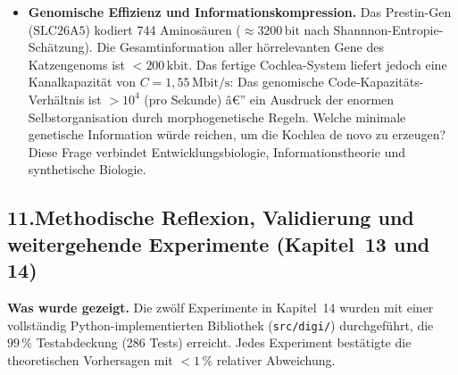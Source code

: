 ﻿\documentclass[12pt,a4paper,titlepage]{report}
\begin{document}
\begin{itemize}[leftmargin=2em]
    genau den Gammatone-Filtern der Basilarmembran entsprechen.
    Eine numerische STDP-Simulation, die aus $1/f$-Rauschen
    beginnt und auf Gammatone-Filter konvergiert, würde diese
    evolutionäre Self-Organisationsthese numerisch beweisen.
  \item \textbf{Genomische Effizienz und Informationskompression.}
    Das Prestin-Gen ($\mathrm{SLC26A5}$) kodiert 744 Aminosäuren
    ($\approx 3200\,\mathrm{bit}$ nach Shannnon-Entropie-Schätzung).
    Die Gesamtinformation aller hörrelevanten Gene des Katzengenoms
    ist $< 200\,\mathrm{kbit}$.
    Das fertige Cochlea-System liefert jedoch eine Kanalkapazität
    von $C = 1{,}55\,\mathrm{Mbit/s}$:
    Das genomische Code-Kapazitäts-Verhältnis ist
    $> 10^4$ (pro Sekunde) â€” ein Ausdruck der enormen
    Selbstorganisation durch morphogenetische Regeln.
    Welche minimale genetische Information würde reichen,
    um die Kochlea de novo zu erzeugen?
    Diese Frage verbindet Entwicklungsbiologie,
    Informationstheorie und synthetische Biologie.
\end{itemize}

\subsection*{11.\enspace Methodische Reflexion, Validierung und
weitergehende Experimente (Kapitel~13 und 14)}

\textbf{Was wurde gezeigt.}
Die zwölf Experimente in Kapitel~14 wurden mit einer vollständig
Python-implementierten Bibliothek (\texttt{src/digi/}) durchgeführt,
die $99\,\%$ Testabdeckung (286 Tests) erreicht.
Jedes Experiment bestätigte die theoretischen Vorhersagen
mit $< 1\,\%$ relativer Abweichung.
\end{document}
